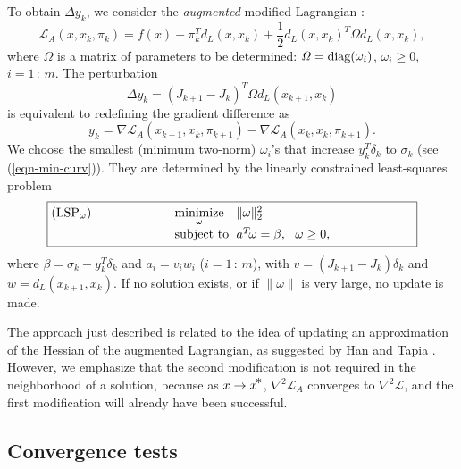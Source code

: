\documentclass[draft,leqno,onefignum,onetabnum]{siamltex}
\makeatletter
\def\A{_{\scriptscriptstyle A}}
\def\varDelta{{\mathit\Delta}}
\def\varOmega{{\mathit\Omega}}
\def\Deltait{\varDelta}
\def\Omegait{\varOmega}
\def\grad{\nabla}
\def\half  {{\textstyle{\frac12}}}
\def\Hess{\nabla^2}
\def\kp#1{_{k+#1}}
\def\minim{\mathop{\hbox{\rm minimize}}}
\def\minimize#1{{\displaystyle\minim_{#1}}}
\def\norm#1{\|#1\|}
\def\nthinsp{\mskip -2   mu}
\def\Lscr{{\mathcal L}}
\def\subject{\mbox{\rm subject to}}
\def\superstar{^{\raise 0.5pt\hbox{$\nthinsp *$}}}
\def\T{^T\!}
\def\xstar{x\superstar}
\def\Deltay{\Deltait y}
\def\Jk{J_k}
\def\Jkp{J_{k+1}}
\def\dL{d_{\scriptscriptstyle L}} %
\def\L {\Lscr}                    %
\def\LA{\Lscr\A}                  %
\def\problem#1#2#3#4{\fbox
   {\begin{tabular*}{0.84\textwidth}
    {@{}l@{\extracolsep{\fill}}l@{\extracolsep{6pt}}l@{\extracolsep{\fill}}c@{}}
      #1 & $\minimize{#2}$ & $#3$ & $ $ \\[5pt]
         & $\subject$      & $#4$ & $ $
    \end{tabular*}}}
\newcommand{\till}{\,{:}\,}                 %
\newcommand{\twonorm}[1]{\norm{#1}_2}
\makeatother
\begin{document}
To obtain $\Deltay_k$, we consider the \emph{augmented} modified Lagrangian
\cite{MurS82}:
\begin{equation} \label{eqn-LA-def}
        \LA(x,x_k,\pi_k)
           = f(x) - \pi_k^T \dL(x,x_k)
                  +   \half \dL(x,x_k)\T \Omegait \dL(x,x_k),
\end{equation}
where $\Omegait$ is a matrix of parameters to be determined:
$\Omegait = \diag(\omega_i)$, $\omega_i \ge 0$, $i=1\till m$.
The perturbation
$$
  \Deltay_k = (\Jkp - \Jk)\T \Omegait \dL(x\kp1,x_k)
$$
is equivalent to redefining the gradient difference as
\begin{equation} \label{eqn-newy}
        y_k = \grad \LA(x\kp1,x_k,\pi\kp1) - \grad \LA(x_k,x_k,\pi\kp1).
\end{equation}
We choose the smallest (minimum two-norm) $\omega_i$'s that increase
$y_k\T\delta_k$ to $\sigma_k$ (see (\ref{eqn-min-curv})).
They are determined by the linearly constrained least-squares problem
\[
   \problem{(LSP$_\omega$)}{\omega}
           {\twonorm{\omega}^2}
           {a\T \omega = \beta,\ \ \omega \ge 0,}
\]
where $\beta = \sigma_k - y_k\T\delta_k$ and $a_i = v_i w_i$ ($i=1\till m$),
with $v = (\Jkp - \Jk)\delta_k$ and $w = \dL(x\kp1,x_k)$.
If no solution exists, or if $\norm{\omega}$
is very large, no update is made.

The approach just described is related to the idea of updating an
approximation of the Hessian of the augmented Lagrangian, as suggested
by Han \cite{Han76} and Tapia \cite{Tap74b}.  However, we emphasize
that the second modification is not required in the neighborhood of a
solution, because as $x \to \xstar$, $\Hess\LA$ converges to
$\Hess\L$, and the first modification will already have been successful.


 \subsection{Convergence tests}  \label{sec-convergence}
\end{document}
